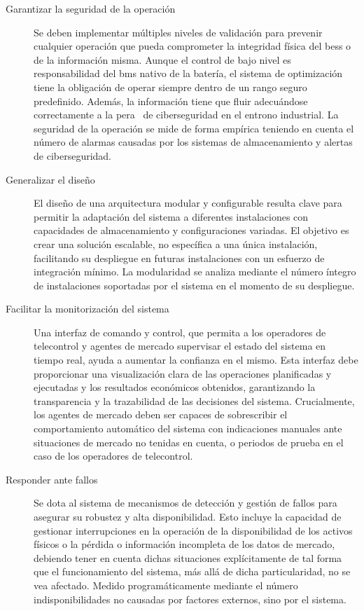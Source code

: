 \begin{description}
  \item[Garantizar la seguridad de la operación] Se deben implementar múltiples niveles de validación para prevenir cualquier operación que pueda comprometer la integridad física del \gls{bess} o de la información misma. Aunque el control de bajo nivel es responsabilidad del \gls{bms} nativo de la batería, el sistema de optimización tiene la obligación de operar siempre dentro de un rango seguro predefinido. Además, la información tiene que fluir adecuándose correctamente a la \gls{pera}~\cite{williams1994purdue} de ciberseguridad en el entrono industrial. La seguridad de la operación se mide de forma empírica teniendo en cuenta el número de alarmas causadas por los sistemas de almacenamiento y alertas de ciberseguridad.

  \item[Generalizar el diseño] El diseño de una arquitectura modular y configurable resulta clave para permitir la adaptación del sistema a diferentes instalaciones con capacidades de almacenamiento y configuraciones variadas. El objetivo es crear una solución escalable, no específica a una única instalación, facilitando su despliegue en futuras instalaciones con un esfuerzo de integración mínimo. La modularidad se analiza mediante el número íntegro de instalaciones soportadas por el sistema en el momento de su despliegue.

  \item[Facilitar la monitorización del sistema] Una interfaz de comando y control, que permita a los operadores de telecontrol y agentes de mercado supervisar el estado del sistema en tiempo real, ayuda a aumentar la confianza en el mismo. Esta interfaz debe proporcionar una visualización clara de las operaciones planificadas y ejecutadas y los resultados económicos obtenidos, garantizando la transparencia y la trazabilidad de las decisiones del sistema. Crucialmente, los agentes de mercado deben ser capaces de sobrescribir el comportamiento automático del sistema con indicaciones manuales ante situaciones de mercado no tenidas en cuenta, o periodos de prueba en el caso de los operadores de telecontrol.

  \item[Responder ante fallos] Se dota al sistema de mecanismos de detección y gestión de fallos para asegurar su robustez y alta disponibilidad. Esto incluye la capacidad de gestionar interrupciones en la operación de la disponibilidad de los activos físicos o la pérdida o información incompleta de los datos de mercado, debiendo tener en cuenta dichas situaciones explícitamente de tal forma que el funcionamiento del sistema, más allá de dicha particularidad, no se vea afectado. Medido programáticamente mediante el número indisponibilidades no causadas por factores externos, sino por el sistema.


\end{description}
